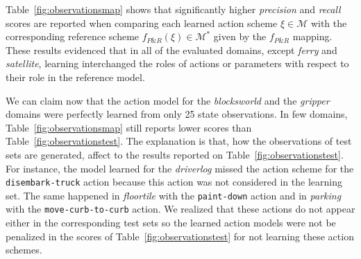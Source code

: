 \documentclass{article}
\begin{document}
Table~\ref{fig:observationsmap} shows that significantly higher {\em precision} and {\em recall} scores are reported when comparing each learned action scheme $\xi\in\mathcal{M}$ with the corresponding reference scheme $f_{P\&R}(\xi)\in \mathcal{M}^*$ given by the $f_{P\&R}$ mapping. These results evidenced that in all of the evaluated domains, except {\em ferry} and {\em satellite}, learning interchanged the roles of actions or parameters with respect to their role in the reference model.

We can claim now that the action model for the {\em blocksworld} and the {\em gripper} domains were perfectly learned from only 25 state observations. In few domains, Table~\ref{fig:observationsmap} still reports lower scores than Table~\ref{fig:observationstest}. The explanation is that, how the observations of test sets are generated, affect to the results reported on Table~\ref{fig:observationstest}. For instance, the model learned for the {\em driverlog} missed the action scheme for the {\tt disembark-truck} action because this action was not considered in the learning set. The same happened in {\em floortile} with the {\tt paint-down} action and in {\em parking} with the {\tt move-curb-to-curb} action. We realized that these actions do not appear either in the corresponding test sets so the learned action models were not be penalized in the scores of Table~\ref{fig:observationstest} for not learning these action schemes.  %
\end{document}
